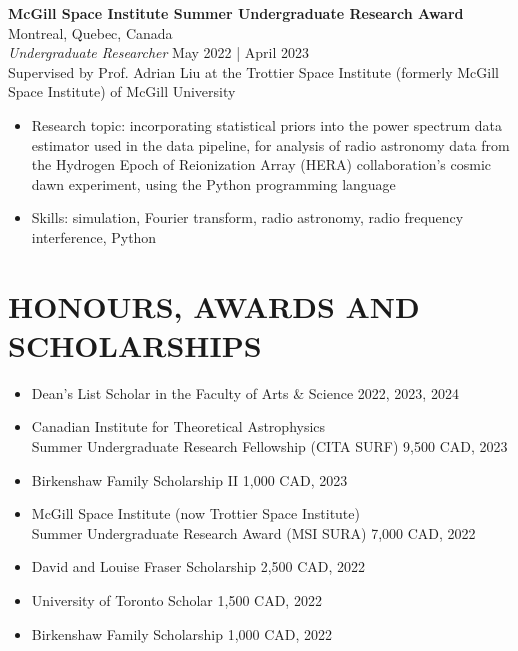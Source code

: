 \documentclass[a4paper,10pt]{extarticle}
\begin{document}
 
\textbf{McGill Space Institute Summer Undergraduate Research Award} \hfill Montreal, Quebec, Canada\\
\textit{Undergraduate Researcher} \hfill May 2022 | April 2023\\
Supervised by Prof. Adrian Liu at the Trottier Space Institute (formerly McGill Space Institute) of McGill University
\begin{itemize}
    \item Research topic: incorporating statistical priors into the power spectrum data estimator used in the data pipeline, for analysis of radio astronomy data from the Hydrogen Epoch of Reionization Array (HERA) collaboration's cosmic dawn experiment, using the Python programming language

    \item Skills: simulation, Fourier transform, radio astronomy, radio frequency interference, Python
\end{itemize}


\newpage
\section*{HONOURS, AWARDS AND SCHOLARSHIPS}
\begin{itemize}
    \item Dean's List Scholar in the Faculty of Arts \& Science \hfill 2022, 2023, 2024

    \item Canadian Institute for Theoretical Astrophysics \\
    Summer Undergraduate Research Fellowship (CITA SURF) \hfill 9,500 CAD, 2023
    
    \item Birkenshaw Family Scholarship II \hfill 1,000 CAD, 2023

    \item McGill Space Institute (now Trottier Space Institute) \\Summer Undergraduate Research Award (MSI SURA) \hfill 7,000 CAD, 2022

    \item David and Louise Fraser Scholarship \hfill 2,500 CAD, 2022

    \item University of Toronto Scholar \hfill 1,500 CAD, 2022

    \item Birkenshaw Family Scholarship \hfill 1,000 CAD, 2022

\end{itemize}
\end{document}
